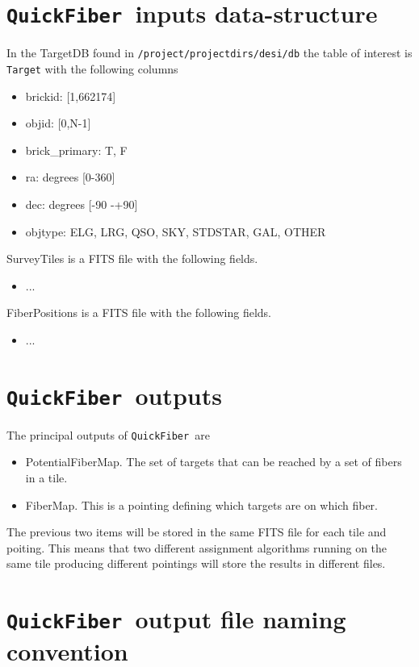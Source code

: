 \documentclass{article}
\newcommand{\code}{{\texttt{QuickFiber}}}
\begin{document}
\section{\code\ inputs data-structure}


In the TargetDB found in \texttt{/project/projectdirs/desi/db} the
table of interest is \texttt{Target} with the following columns

\begin{itemize}
\item brickid: [1,662174]
\item objid: [0,N-1]
\item brick\_primary: T, F
\item ra: degrees [0-360]
\item dec: degrees [-90 -+90]
\item objtype: ELG, LRG, QSO, SKY, STDSTAR, GAL, OTHER
\end{itemize}

\noindent
SurveyTiles is a FITS file with the following fields.
\begin{itemize}
\item ...
\end{itemize}

FiberPositions is a FITS file with the following fields.
\begin{itemize}
\item ...
\end{itemize}



\section{\code\ outputs}

The principal outputs of \code\ are
\begin{itemize}
\item PotentialFiberMap. The set of targets that can be reached by a
  set of fibers in a  tile.  
\item FiberMap. This is a pointing defining which targets are on which
  fiber.
\end{itemize}

The previous two items will be stored in the same FITS file for each
tile and poiting. This means that two different assignment algorithms
running on the same tile producing different pointings will store
the results in different files. 

\section{\code\ output file naming convention}
\end{document}
